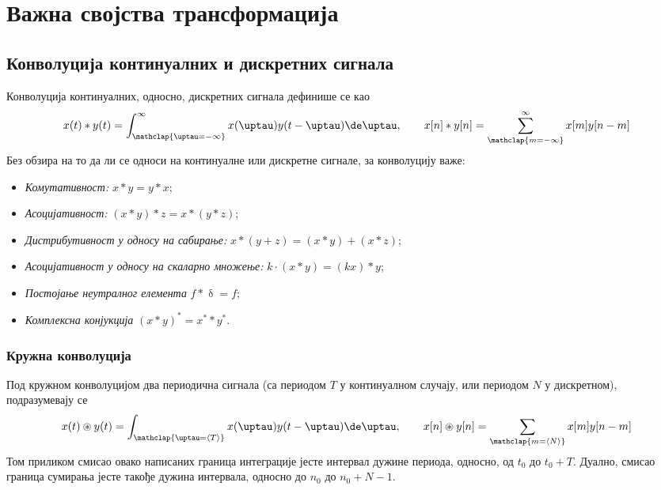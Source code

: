 \renewcommand{\thechapter}{S}
\setcounter{section}{0}
\chapter{Важна својства трансформација}


\section*{Конволуција континуалних и дискретних сигнала}
Конволуција континуалних, односно, дискретних сигнала дефинише се као 
\begin{equation}
    x(t) \ast y(t) = \int_{\mathclap{\uptau = -\infty}}^{\infty} x(\uptau) y(t-\uptau) \de \uptau, 
    \qquad
    x[n] \ast y[n] = \sum_{\mathclap{m = -\infty}}^{\infty} x[m] y[n-m] 
\end{equation}
Без обзира на то да ли се односи на континуалне или дискретне сигнале, за конволуцију важе:
\begin{itemize}\itemsep0pt
    \item \emph{Комутативност:} $x \ast y = y \ast x$;
    \item \emph{Асоцијативност:} $(x \ast y) \ast z = x \ast (y \ast z)$;
    \item \emph{Дистрибутивност у односу на сабирање:} $x \ast (y + z) = (x \ast y) + (x \ast z)$;
    \item \emph{Асоцијативност у односу на скаларно множење:} $k \cdot (x \ast y) = (kx) \ast y$; 
    \item \emph{Постојање неутралног елемента} $f \ast \updelta = f$; 
    \item \emph{Комплексна конјукција} $(x \ast y)^\ast = x^{\ast} \ast y^{\ast}$.
\end{itemize}

\subsection*{Кружна конволуција}
Под кружном конволуцијом два периодична сигнала (са периодом $T$ у континуалном случају, или 
периодом $N$ у дискретном), подразумевају се 
\begin{equation}
    x(t) \circledast y(t) = \int_{\mathclap{\uptau = \langle T \rangle }} x(\uptau) y(t-\uptau) \de \uptau, 
    \qquad
    x[n] \circledast y[n] = \sum_{\mathclap{m = \langle N \rangle }} x[m] y[n-m] 
\end{equation}
Том приликом смисао овако написаних граница интеграције јесте интервал дужине периода, односно, од $t_0$ до $t_0 + T$. 
Дуално, смисао граница сумирања јесте такође дужина интервала, односно до $n_0$ до $n_0 + N - 1$. 

